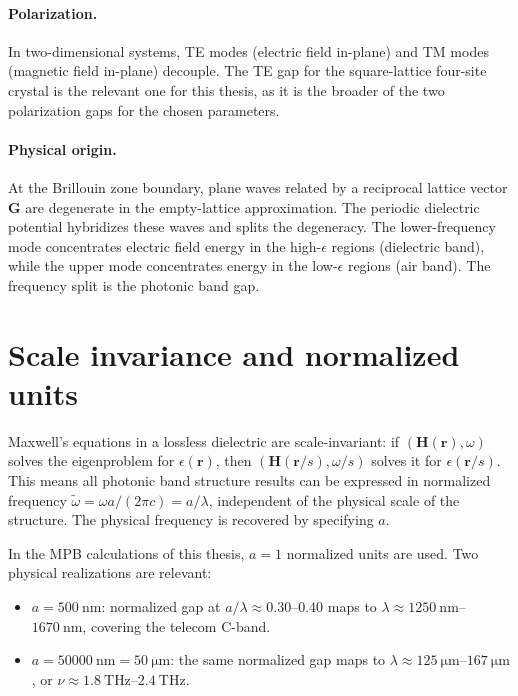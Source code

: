 \documentclass[12pt,a4paper,oneside]{book}
\theoremstyle{plain}
\theoremstyle{definition}
\theoremstyle{remark}
\newcommand{\vb}[1]{\bm{#1}}
\newcommand{\Hfield}{\vb{H}}
\newcommand{\eps}{\epsilon}
\newcommand{\om}{\omega}
\newcommand{\rvec}{\vb{r}}
\begin{document}
\paragraph{Polarization.} In two-dimensional systems, TE modes (electric field in-plane) and TM modes (magnetic field in-plane) decouple. The TE gap for the square-lattice four-site crystal is the relevant one for this thesis, as it is the broader of the two polarization gaps for the chosen parameters.

\paragraph{Physical origin.} At the Brillouin zone boundary, plane waves related by a reciprocal lattice vector $\vb{G}$ are degenerate in the empty-lattice approximation. The periodic dielectric potential hybridizes these waves and splits the degeneracy. The lower-frequency mode concentrates electric field energy in the high-$\eps$ regions (dielectric band), while the upper mode concentrates energy in the low-$\eps$ regions (air band). The frequency split is the photonic band gap.

\section{Scale invariance and normalized units}
\label{sec:scaling}

Maxwell's equations in a lossless dielectric are scale-invariant: if $(\Hfield(\rvec), \om)$ solves the eigenproblem for $\eps(\rvec)$, then $(\Hfield(\rvec/s), \om/s)$ solves it for $\eps(\rvec/s)$. This means all photonic band structure results can be expressed in normalized frequency $\tilde{\om} = \om a/(2\pi c) = a/\lambda$, independent of the physical scale of the structure. The physical frequency is recovered by specifying $a$.

In the MPB calculations of this thesis, $a = 1$ normalized units are used. Two physical realizations are relevant:
\begin{itemize}
  \item $a = \SI{500}{\nano\metre}$: normalized gap at $a/\lambda \approx 0.30$--$0.40$ maps to $\lambda \approx \SI{1250}{\nano\metre}$--$\SI{1670}{\nano\metre}$, covering the telecom C-band.
  \item $a = \SI{50000}{\nano\metre} = \SI{50}{\micro\metre}$: the same normalized gap maps to $\lambda \approx \SI{125}{\micro\metre}$--$\SI{167}{\micro\metre}$, or $\nu \approx \SI{1.8}{\tera\hertz}$--$\SI{2.4}{\tera\hertz}$.
\end{itemize}
\end{document}

